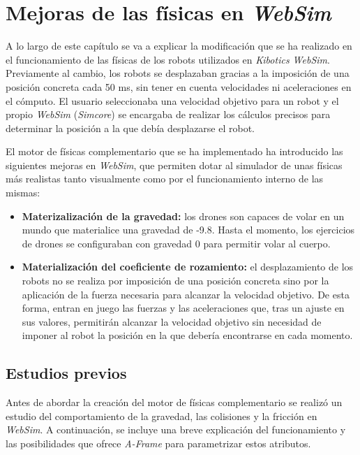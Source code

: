\chapter{Mejoras de las físicas en \textit{WebSim}}
\label{chap:motor_fisicas} 
A lo largo de este capítulo se va a explicar la modificación que se ha realizado en el funcionamiento de las físicas de los robots utilizados en \textit{Kibotics WebSim}. Previamente al cambio, los robots se desplazaban gracias a la imposición de una posición concreta cada 50 ms, sin tener en cuenta velocidades ni aceleraciones en el cómputo. El usuario seleccionaba una velocidad objetivo para un robot y el propio \textit{WebSim} (\textit{Simcore}) se encargaba de realizar los cálculos precisos para determinar la posición a la que debía desplazarse el robot. \newline

El motor de físicas complementario que se ha implementado ha introducido las siguientes mejoras en \textit{WebSim}, que permiten dotar al simulador de unas físicas más realistas tanto visualmente como por el funcionamiento interno de las mismas:

\begin{itemize}
    \item \textbf{Materizalización de la gravedad:} los drones son capaces de volar en un mundo que materialice una gravedad de -9.8. Hasta el momento, los ejercicios de drones se configuraban con gravedad 0 para permitir volar al cuerpo.
    \item \textbf{Materialización del coeficiente de rozamiento:} el desplazamiento de los robots no se realiza por imposición de una posición concreta sino por la aplicación de la fuerza necesaria para alcanzar la velocidad objetivo. De esta forma, entran en juego las fuerzas y las aceleraciones que, tras un ajuste en sus valores, permitirán alcanzar la velocidad objetivo sin necesidad de imponer al robot la posición en la que debería encontrarse en cada momento.
\end{itemize}

\section{Estudios previos}
Antes de abordar la creación del motor de físicas complementario se realizó un estudio del comportamiento de la gravedad, las colisiones y la fricción en \textit{WebSim}. A continuación, se incluye una breve explicación del funcionamiento y las posibilidades que ofrece \textit{A-Frame} para parametrizar estos atributos.

